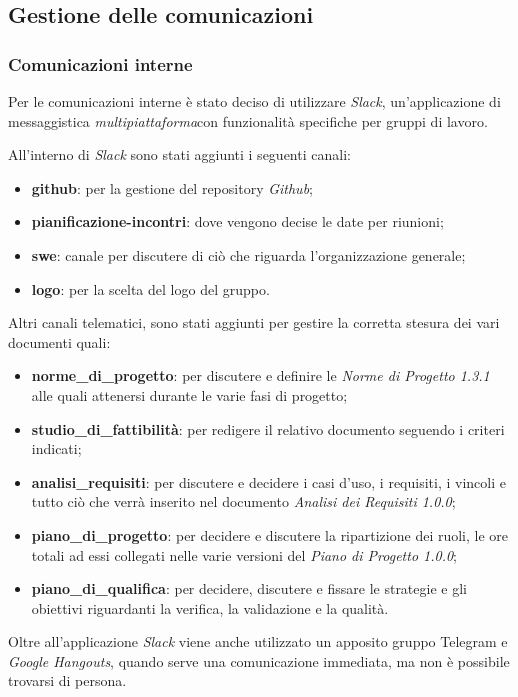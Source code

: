 	\subsection{Gestione delle comunicazioni}
		\subsubsection{Comunicazioni interne}
		Per le comunicazioni interne è stato deciso di utilizzare \textit{ Slack\glos}, un'applicazione di messaggistica \textit{multipiattaforma}\glo con funzionalità specifiche per gruppi di lavoro. 
		
		\noindent All'interno di \textit{Slack\glo} sono stati aggiunti i seguenti canali:
		\begin{itemize}
			\item \textbf{github}: per la gestione del repository \textit{Github\glos};
			\item \textbf{pianificazione-incontri}: dove vengono decise le date per riunioni;
			\item \textbf{swe}: canale per discutere di ciò che riguarda l'organizzazione generale;
			\item \textbf{logo}: per la scelta del logo del gruppo.
			
		\end{itemize}
		Altri canali telematici, sono stati aggiunti per gestire la corretta stesura dei vari documenti quali:
		\begin{itemize}
			\item \textbf{norme\_di\_progetto}: per discutere e definire le \textit{Norme di Progetto 1.3.1\doc} alle quali attenersi durante le varie fasi di progetto;
			\item \textbf{studio\_di\_fattibilità}: per redigere il relativo documento seguendo i criteri indicati;
			\item \textbf{analisi\_requisiti}: per discutere e decidere i casi d'uso, i requisiti, i vincoli e tutto ciò che verrà inserito nel documento \textit{Analisi dei Requisiti 1.0.0\docs};
			\item \textbf{piano\_di\_progetto}: per decidere e discutere la ripartizione dei ruoli, le ore totali ad essi collegati nelle varie versioni del \textit{Piano di Progetto 1.0.0\docs};
			\item \textbf{piano\_di\_qualifica}: per decidere, discutere e fissare le strategie e gli obiettivi riguardanti la verifica, la validazione e la qualità.
		\end{itemize}
		Oltre all'applicazione \textit{Slack\glo} viene anche utilizzato un apposito gruppo Telegram e \textit{Google Hangouts\glo}, quando serve una comunicazione immediata, ma non è possibile trovarsi di persona.
		
